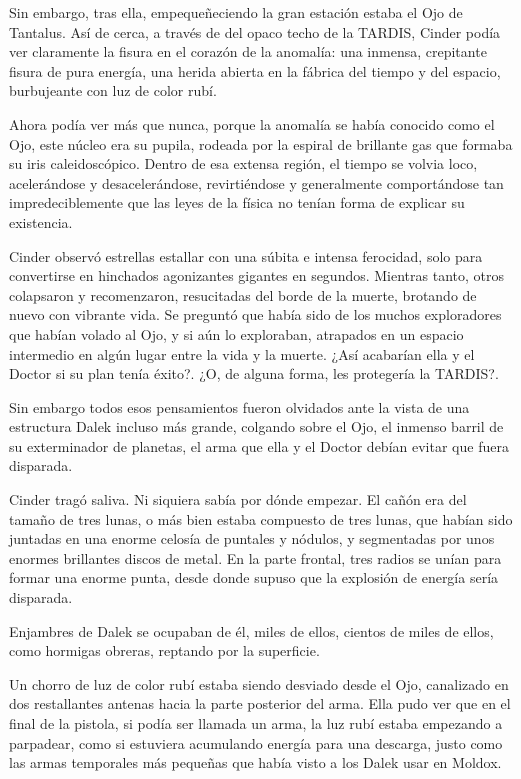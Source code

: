 Sin embargo, tras ella, empequeñeciendo la gran estación estaba el Ojo de Tantalus. Así de cerca, a través de del opaco techo de la TARDIS, Cinder podía ver claramente la fisura en el corazón de la anomalía: una inmensa, crepitante fisura de pura energía, una herida abierta en la fábrica del tiempo y del espacio, burbujeante con luz de color rubí.

Ahora podía ver más que nunca, porque la anomalía se había conocido como el Ojo, este núcleo era su pupila, rodeada por la espiral de brillante gas que formaba su iris caleidoscópico. Dentro de esa extensa región, el tiempo se volvia loco, acelerándose y desacelerándose, revirtiéndose y generalmente comportándose tan impredeciblemente que las leyes de la física no tenían forma de explicar su existencia.

Cinder observó estrellas estallar con una súbita e intensa ferocidad, solo para convertirse en hinchados agonizantes gigantes en segundos. Mientras tanto, otros colapsaron y recomenzaron, resucitadas del borde de la muerte, brotando de nuevo con vibrante vida. Se preguntó que había sido de los muchos exploradores que habían volado al Ojo, y si aún lo exploraban, atrapados en un espacio intermedio en algún lugar entre la vida y la muerte. ¿Así acabarían ella y el Doctor si su plan tenía éxito?. ¿O, de alguna forma, les protegería la TARDIS?. 

Sin embargo todos esos pensamientos fueron olvidados ante la vista de una estructura Dalek incluso más grande, colgando sobre el Ojo, el inmenso barril de su exterminador de planetas, el arma que ella y el Doctor debían evitar que fuera disparada.

Cinder tragó saliva. Ni siquiera sabía por dónde empezar. El cañón era del tamaño de tres lunas, o más bien estaba compuesto de tres lunas, que habían sido juntadas en una enorme celosía de puntales y nódulos, y segmentadas por unos enormes brillantes discos de metal. En la parte frontal, tres radios se unían para formar una enorme punta, desde donde supuso que la explosión de energía sería disparada.

Enjambres de Dalek se ocupaban de él, miles de ellos, cientos de miles de ellos, como hormigas obreras, reptando por la superficie.

Un chorro de luz de color rubí estaba siendo desviado desde el Ojo, canalizado en dos restallantes antenas hacia la parte posterior del arma. Ella pudo ver que en el final de la pistola, si podía ser llamada un arma, la luz rubí estaba empezando a parpadear, como si estuviera acumulando energía para una descarga, justo como las armas temporales más pequeñas que había visto a los Dalek usar en Moldox.

